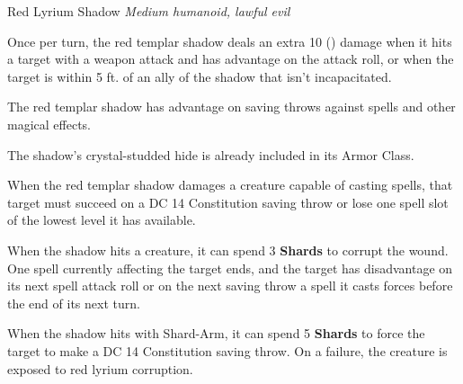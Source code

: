 \begin{monsterbox}{Red Lyrium Shadow}
\textit{Medium humanoid, lawful evil}\\
\rpghline
\basics[
  armorclass = 15 (lyrium hide),
  hitpoints = 30,
  speed = 45 ft.
]
\rpghline
\stats[
  STR = \stat{16},
  DEX = \stat{20},
  CON = \stat{12},
  INT = \stat{12},
  WIS = \stat{14},
  CHA = \stat{10}
]
\rpghline
\details[
  skills = Investigation +2, Religion +2, Perception +4, Stealth +9,
  senses = passive Perception 14,
  languages = Common,
  challenge = 6
]
\rpghline

\begin{rpg-monsteraction}[Backstab]
Once per turn, the red templar shadow deals an extra 10 () damage when it hits a target with a weapon attack and has advantage on the attack roll, or when the target is within 5 ft. of an ally of the shadow that isn't incapacitated.
\end{rpg-monsteraction}

\begin{rpg-monsteraction}
The red templar shadow has advantage on saving throws against spells and other magical effects.
\end{rpg-monsteraction}

\begin{rpg-monsteraction}
The shadow's crystal-studded hide is already included in its Armor Class.
\end{rpg-monsteraction}

\begin{rpg-monsteraction}
When the red templar shadow damages a creature capable of casting spells, that target must succeed on a DC 14 Constitution saving throw or lose one spell slot of the lowest level it has available.
\end{rpg-monsteraction}

\begin{rpg-monsteraction}
When the shadow hits a creature, it can spend 3 \textbf{Shards} to corrupt the wound. One spell currently affecting the target ends, and the target has disadvantage on its next spell attack roll or on the next saving throw a spell it casts forces before the end of its next turn.
\end{rpg-monsteraction}

\begin{rpg-monsteraction}
When the shadow hits with Shard-Arm, it can spend 5 \textbf{Shards} to force the target to make a DC 14 Constitution saving throw. On a failure, the creature is exposed to red lyrium corruption.
\end{rpg-monsteraction}


\end{monsterbox}
